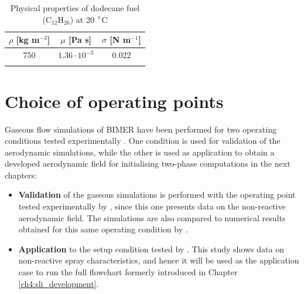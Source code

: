 \begin{table}[!h]
\centering
\caption{Physical properties of dodecane fuel (C$_{12}$H$_26$) at 20 $\degree$C}
\begin{tabular}{ccc}
\thickhline
$\rho$ [kg m$^{-3}$]   & $\mu$ [Pa s]   & $\sigma$ [N m$^{-1}$]  \\
\hline
750 & $1.36 \cdot 10^{-3}$ & 0.022 \\
\thickhline
\end{tabular}
\label{tab:dodecane_properties}
\end{table}

\clearpage

\section{Choice of operating points}

Gaseous flow simulations of BIMER have been performed for two operating conditions tested experimentally . One condition is used for validation of the aerodynamic simulations, while the other is used as application to obtain a developed aerodynamic field for initialising two-phase computations in the next chapters:

\begin{itemize}

	\item \textbf{Validation} of the gaseous simulations is performed with the operating point tested experimentally by , since this one presents data on the non-reactive aerodynamic field. The simulations are also compared to numerical results obtained for this same operating condition by . 
	
	\item \textbf{Application} to the setup condition tested by . This study shows data on non-reactive spray characteristics, and hence it will be used as the application case to run the full flowchart formerly introduced in Chapter \ref{ch4:sli_development}. %

\end{itemize}


